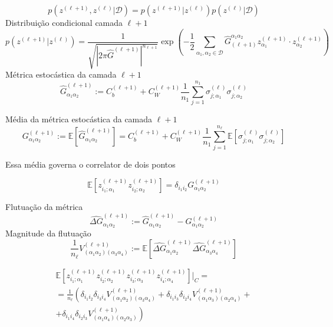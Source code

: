 \documentclass{beamer}
\newcommand{\EE}{\mathbb{E}}
\def\mi#1{{\alpha_{#1}}}
\def\eell{{(\ell)}}
\def\eellum{{(\ell+1)}}
\def\Gchapp#1{\widehat{G}^{(#1)}}
\newcommand{\Gchapeu}[3]{{\Gchapp{#1}_{\mi{#2}\mi{#3}}}}
\newcommand{\Gchapeuinv}[3]{\widehat{G}_{(#1)}^{\mi{#2}\mi{#3}}}
\newcommand{\Gnormal}[3]{{G^{(#1)}_{\mi{#2}\mi{#3}}}}
\newcommand{\Gflutu}[3]{{\widehat{\Delta G}^{(#1)}_{\mi{#2}\mi{#3}}}}
\newcommand{\Vertice}[5]{V^{(#1)}_{(\mi#2\mi#3)(\mi#4\mi#5)}}
\newcommand{\zia}[2]{z_{i_{#1};\mi{#2}}}
\begin{document}
\begin{frame}
	\begin{equation*}\tag{4.67}
		p\left(z^\eellum,z^\eell\Big|\mathcal{D}\right) = p\left(z^\eellum\Big| z^\eell\right)p\left(z^\eell\Big| \mathcal{D}\right)
	\end{equation*}
	Distribuição condicional camada $\ell+1$
{\footnotesize
	\begin{equation*}\tag{4.69}
			p\left(z^\eellum\Big| z^\eell\right) = \frac{1}{\sqrt{\left|2\pi \hat{G}^\eellum\right|^{n_{\ell+1}}}}
			\exp\left(-\frac{1}{2} \sum_{\mi1,\mi2\in\mathcal{D}} \Gchapeuinv{\ell+1}12 z^\eellum_{\mi1}\cdot z^\eellum_{\mi2} \right)
		\end{equation*}
}
Métrica estocástica da camada $\ell+1$
	\begin{equation*}\tag{4.70}
		\Gchapeu{\ell+1}12 := C_b^\eellum + C_W^\eellum\frac{1}{n_1}\sum_{j=1}^{n_1} \sigma_{j;\mi1}^\eell\sigma_{j;\mi2}^\eell
	\end{equation*}
\end{frame}

\begin{frame}
	Média da métrica estocástica da camada $\ell+1$
	\begin{equation*}\tag{4.72}
		\Gnormal{\ell+1}12 := \EE\left[\Gchapeu{\ell+1}12 \right] =  C_b^\eellum + C_W^\eellum\frac{1}{n_1}\sum_{j=1}^{n_\ell} \EE\left[\sigma_{j;\mi1}^\eell\sigma_{j;\mi2}^\eell\right]
	\end{equation*}

	Essa média governa o correlator de dois pontos

	\begin{equation*}\tag{4.73}
		\EE\left[\zia11^\eellum \zia22^\eellum\right] = \delta_{i_1i_2}\Gnormal{\ell+1}12 
	\end{equation*}
\end{frame}

\begin{frame}
	
	Flutuação da métrica 
	\begin{equation*}\tag{4.74}
		\Gflutu{\ell+1}12 := \Gchapeu{\ell+1}12 - \Gnormal{\ell+1}12
	\end{equation*}
	Magnitude da flutuação
	\begin{equation*}\tag{4.76}
		\frac{1}{n_\ell}\Vertice{\ell+1}1234 := \EE\left[\Gflutu{\ell+1}12 \Gflutu{\ell+1}34 \right]
	\end{equation*}
\end{frame}

\begin{frame}
	\begin{multline*}
		\EE\left[\zia11^\eellum \zia22^\eellum \zia33^\eellum \zia44^\eellum\right]\Big|_{C} =\\= \frac{1}{n_\ell}\left( 
			\delta_{i_1i_2}\delta_{i_3i_4} \Vertice{\ell+1}1234 +
			\delta_{i_1i_3}\delta_{i_2i_4} \Vertice{\ell+1}1324 +\right.\\+\left.
			\delta_{i_1i_4}\delta_{i_2i_3} \Vertice{\ell+1}1423 
		\right)\tag{4.77}
	\end{multline*}
\end{frame}
\end{document}
